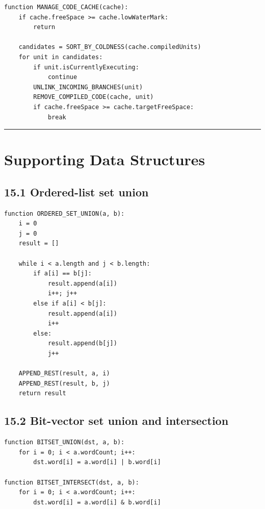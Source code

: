 \documentclass[10pt,letterpaper]{article}
\begin{document}
\begin{verbatim}
function MANAGE_CODE_CACHE(cache):
    if cache.freeSpace >= cache.lowWaterMark:
        return

    candidates = SORT_BY_COLDNESS(cache.compiledUnits)
    for unit in candidates:
        if unit.isCurrentlyExecuting:
            continue
        UNLINK_INCOMING_BRANCHES(unit)
        REMOVE_COMPILED_CODE(cache, unit)
        if cache.freeSpace >= cache.targetFreeSpace:
            break
\end{verbatim}

\medskip\hrule\medskip

\clearpage
\section{Supporting Data Structures}

\subsection*{15.1 Ordered-list set union}

\begin{verbatim}
function ORDERED_SET_UNION(a, b):
    i = 0
    j = 0
    result = []

    while i < a.length and j < b.length:
        if a[i] == b[j]:
            result.append(a[i])
            i++; j++
        else if a[i] < b[j]:
            result.append(a[i])
            i++
        else:
            result.append(b[j])
            j++

    APPEND_REST(result, a, i)
    APPEND_REST(result, b, j)
    return result
\end{verbatim}

\subsection*{15.2 Bit-vector set union and intersection}

\begin{verbatim}
function BITSET_UNION(dst, a, b):
    for i = 0; i < a.wordCount; i++:
        dst.word[i] = a.word[i] | b.word[i]

function BITSET_INTERSECT(dst, a, b):
    for i = 0; i < a.wordCount; i++:
        dst.word[i] = a.word[i] & b.word[i]
\end{verbatim}
\end{document}
